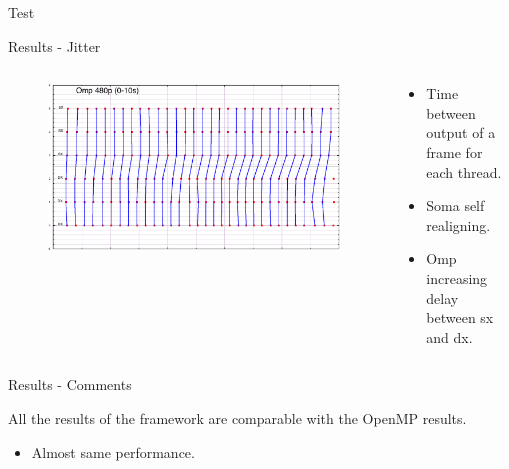 \documentclass[xcolor=dvipsnames]{beamer}
\begin{document}
\begin{section}{Test}
\begin{frame}{\hskip 0.3cm Results - Jitter}
\begin{columns}
\begin{column}{6.5cm}
\vskip -0.5cm
\begin{figure}

\includegraphics[scale=0.13]{omp_480_range_010.png}
\end{figure}

\end{column}

\begin{column}{5cm}

\begin{itemize}

\item Time between output of a frame for each thread.

\item Soma self realigning.

\item Omp increasing delay between sx and dx.

\end{itemize}

\end{column}

\end{columns}

\end{frame}












\begin{frame}{\hskip 0.3cm Results - Comments}

All the results of the framework are comparable with the OpenMP results.

\begin{itemize}

\item Almost same performance.


\end{itemize}
\end{frame}
\end{section}
\end{document}
